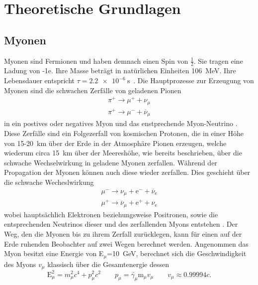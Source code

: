 \section{Theoretische Grundlagen}
    \subsection{Myonen}
        Myonen sind Fermionen und haben demnach einen Spin von $\frac{1}{2}$. Sie tragen eine Ladung von -1e. Ihre Masse beträgt in natürlichen Einheiten \SI{106}{\mega\electronvolt}. Ihre Lebensdauer 
        entspricht $\tau = \SI{2.2e-6}{\second}$~\cite{zyla_review_2020}. Die Hauptprozesse zur Erzeugung von Myonen sind die schwachen Zerfälle von geladenen Pionen
        \begin{align*}
            \pi^+ \longrightarrow \mu^+ + \nu_{\mu} \\
            \pi^+ \longrightarrow \mu^- + \overline{\nu}_{\mu}
        \end{align*}
        in ein postives oder negatives Myon und das enstprechende Myon-Neutrino \cite{grupen_einstieg_2018}. Diese Zerfälle sind ein Folgezerfall von kosmischen Protonen, die in einer Höhe von 
        15-\SI{20}{\kilo\metre} über der Erde in der Atmosphäre Pionen erzeugen, welche wiederum circa \SI{15}{\kilo\metre} über der Meereshöhe, wie bereits beschrieben, über die schwache Wechselwirkung in 
        geladene Myonen zerfallen. Während der Propagation der Myonen können auch diese wieder zerfallen. Dies geschieht über die schwache Wecheslwirkung 
        \begin{align*}
            \mu^- \longrightarrow \nu_{\mu} + \text{e}^- + \overline{\nu}_{\text{e}} \\
            \mu^+ \longrightarrow \overline{\nu}_{\mu} + \text{e}^+ + \nu_{\text{e}} 
        \end{align*}
        wobei hauptsächlich Elektronen beziehungsweise Positronen, sowie die entsprechenden Neutrinos dieser und des zerfallenden Myons entstehen \cite{grupen_einstieg_2018}. Der Weg, den die Myonen bis zu 
        ihrem Zerfall zurücklegen, kann für einen auf der Erde ruhenden Beobachter auf zwei Wegen berechnet werden. Angenommen das Myon besitzt eine Energie von E$_{\mu}$=\SI{10}{\giga\electronvolt}, berechnet 
        sich die Geschwindigkeit des Myons $v_{\mu}$ klassisch über die Gesamtenergie dessen 
        \begin{equation*}
            \text{E}_{\mu}^2 = m_{\mu}^2c^4 + p_{\mu}^2c^2 \qquad \underrightarrow{p_{\mu}=\gamma_{\mu} \text{m}_{\mu}v_{\mu}} \qquad v_{\mu} \approx \num{0.99994}c .
        \end{equation*}
